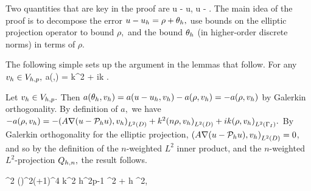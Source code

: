 Two quantities that are key in the proof are
\beqs
\rho \de u - \Ph u, \tand
\eeqs
\beqs
\thetah \de \Ph u - \uh.
\eeqs
The main idea of the proof is to decompose the error $u - u_{h} = \rho + \theta_{h},$ use bounds on the elliptic projection operator to bound $\rho,$ and the bound $\theta_{h}$ (in higher-order discrete norms) in terms of $\rho.$

The following simple  sets up the argument in the lemmas that follow.
\label{lem:simpleform}
For any $v_{h} \in V_{h,p},$
\beq\label{eq:thetaform}
a(\thetah,\vh) = k^2\IPLtDn{\Qhn\rho}{\vh} + ik \IPLtGI{\rho}{\vh}.
\eeq
\ele

Let $v_{h} \in V_{h,p}.$ Then $a(\theta_{h},v_{h}) = a(u-u_{h},v_{h}) - a(\rho,v_{h}) = -a(\rho,v_{h})$ by Galerkin orthogonality. By definition of $a,$ we have $-a(\rho,\vh) = -\IPLtD{A\grad\mleft(u-\Ph u\mright)}{\vh} + k^2 \IPLtD{n\rho}{\vh} + ik\IPLtGI{\rho}{\vh}.$ By Galerkin orthogonality for the elliptic projection, $\IPLtD{A\grad\mleft(u-\Ph u\mright)}{\vh} = 0$, and so by the definition of the $n$-weighted $L^2$ inner product, and the $n$-weighted $L^2$-projection $Q_{h,n},$ the result follows.
\epf

\label{lem:boundarybound}
\beq\label{eq:boundarybound}
\NLtGI{\thetah}^2 \leq \Cboundaryo \mleft(\En\nvar\mright)^{2\mleft(+1\mright)}^4 k^2 h^{2p-1} ^2 + \Cboundaryt h \NW{\rho}^2,
\eeq
\ele


